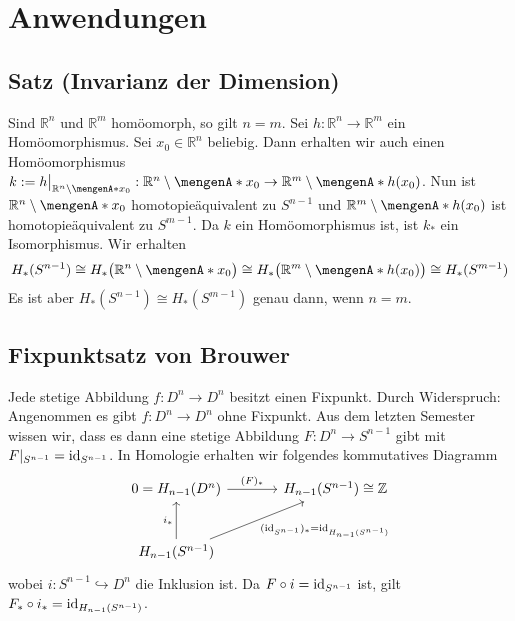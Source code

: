 \section{Anwendungen} %
\label{sec:10}

\subsection[Satz: Invarianz der Dimension]{Satz (Invarianz der Dimension)} %
\label{sub:101}
Sind $\mathds{R}^n$ und $\mathds{R}^m$ homöomorph, so gilt $n=m$. 
Sei $h : \mathds{R}^n \to \mathds{R}^m$ ein Homöomorphismus. Sei $x_0 \in \mathds{R}^n$ beliebig. Dann erhalten wir auch einen Homöomorphismus 
$k := h\big|_{\mathds{R}^n\setminus \set{x_0}} : \mathds{R}^n \setminus \set{x_0} \to \mathds{R}^m  \setminus \set{h(x_0)}$. Nun ist $\mathds{R}^n \setminus \set{x_0}$
homotopieäquivalent zu $S^{n-1}$ und $\mathds{R}^{m}\setminus\set{h(x_0)}$ ist homotopieäquivalent zu $S^{m-1}$. Da $k$ ein Homöomorphismus ist, ist $k_*$ ein Isomorphismus.
Wir erhalten
\begin{align*}
	H_*(S^{n-1}) \cong H_* \enbrace[\big]{\mathds{R}^n \setminus \set{x_0}}  \cong H_* \enbrace[\big]{\mathds{R}^m \setminus \set{h(x_0)}} \cong H_*(S^{m-1})
\end{align*}
Es ist aber $H_*(S^{n-1}) \cong H_*(S^{m-1})$ genau dann, wenn $n=m$. \bewende

\subsection{Fixpunktsatz von Brouwer} %
\label{sub:102}
Jede stetige Abbildung $f \colon D^n \to D^n$ besitzt einen Fixpunkt.
Durch Widerspruch: Angenommen es gibt $f : D^n \to D^n$ ohne Fixpunkt. Aus dem letzten Semester wissen wir, dass es dann eine stetige Abbildung $F : D^n \to S^{n-1}$ gibt 
mit $F|_{S^{n-1}} = \operatorname{id}_{S^{n-1}}$. In Homologie erhalten wir folgendes kommutatives Diagramm 
\[
	\begin{tikzcd}[sep=large]
		0 = H_{n-1}(D^n) \rar["(F)_*"] & H_{n-1}(S^{n-1}) \cong \mathds{Z} \\
		H_{n-1}(S^{n-1}) \uar["i_*"] \urar["(\id_{S^{n-1}})_* = \id_{H_{n-1}(S^{n-1})}"']
	\end{tikzcd}
\]
wobei $i : S^{n-1} \hookrightarrow D^n$ die Inklusion ist. Da $F \circ i = \operatorname{id}_{S^{n-1}}$ ist, gilt $F_* \circ i_* = \operatorname{id}_{H_{n-1}(S^{n-1})}$. \light \bewende
